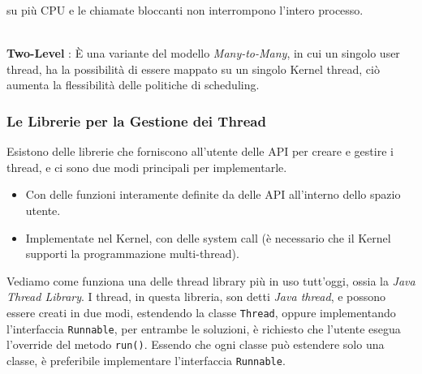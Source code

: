 \documentclass[12pt, letterpaper]{article}
\newcommand{\code}[1]{\colorbox{light-gray}{\texttt{#1}}}
\begin{document}
su più CPU e le chiamate bloccanti non interrompono l'intero processo.\begin{figure}[h]
\end{figure}
\\\textbf{Two-Level} : È una variante del modello \textit{Many-to-Many}, in cui un singolo user thread, ha la 
possibilità di essere mappato su un singolo Kernel thread, ciò aumenta la flessibilità delle politiche di scheduling.\begin{figure}[h]
\end{figure}
\subsubsection{Le Librerie per la Gestione dei Thread}
Esistono delle librerie che forniscono all'utente delle API per creare e gestire i thread, e ci sono due 
 modi principali per implementarle.\begin{itemize}
    \item Con delle funzioni interamente definite da delle API all'interno dello 
    spazio utente.
    \item Implementate nel Kernel, con delle system call (è necessario 
    che il Kernel supporti la programmazione multi-thread).
 \end{itemize}
 Vediamo come funziona una delle thread library più in uso tutt'oggi, 
 ossia la \textit{Java Thread Library}. I thread, in questa libreria, son 
 detti \textit{Java thread}, e possono essere creati in due modi, estendendo 
 la classe \code{Thread}, oppure implementando l'interfaccia 
 \code{Runnable}, per entrambe le soluzioni, è richiesto che l'utente 
 esegua l'override del metodo \code{run()}. Essendo che ogni classe 
 può estendere solo una classe, è preferibile implementare l'interfaccia 
 \code{Runnable}.
\end{document}
